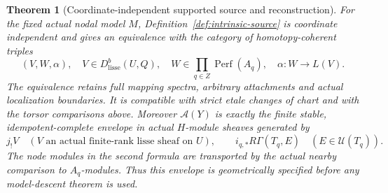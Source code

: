 \documentclass[11pt]{article}
\newtheorem{theorem}{Theorem}[section]
\theoremstyle{definition}
\theoremstyle{remark}
\newcommand{\Perf}{\operatorname{Perf}}
\begin{document}
\begin{theorem}[Coordinate-independent supported source and reconstruction]
\label{thm:local-supported-source}
For the fixed actual nodal model $M$, Definition~\ref{def:intrinsic-source}
is coordinate independent and gives an equivalence with the category
of homotopy-coherent triples
\[
 (V,W,\alpha),\quad V\in D^b_{\mathrm{lisse}}(U,Q),\quad
 W\in\prod_{q\in Z}\Perf(A_q),\quad
 \alpha:W\longrightarrow L(V).
\]
The equivalence retains full mapping spectra, arbitrary attachments
and actual localization boundaries.  It is compatible with strict
etale changes of chart and with the torsor comparisons above.
Moreover $\mathcal A(Y)$ is exactly the finite stable,
idempotent-complete envelope in actual $H$-module sheaves generated by
\[
 j_!V\quad(V\text{ an actual finite-rank lisse sheaf on }U),
 \qquad
 i_{q,*}R\Gamma(T_q,E)\quad(E\in\mathcal U(T_q)).
\]
The node modules in the second formula are transported by the actual
nearby comparison to $A_q$-modules.  Thus this envelope is geometrically
specified before any model-descent theorem is used.
\end{theorem}
\end{document}
